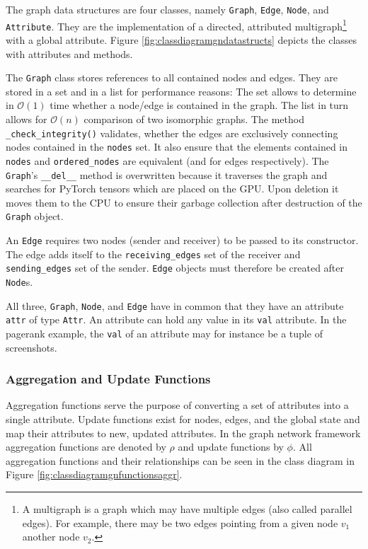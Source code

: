 The graph data structures are four classes, namely \texttt{Graph}, \texttt{Edge}, \texttt{Node}, and \texttt{Attribute}. They are the implementation of a directed, attributed multigraph\footnote{A multigraph is a graph which may have multiple edges (also called parallel edges). For example, there may be two edges pointing from a given node $v_1$ another node $v_2$.} with a global attribute. Figure \ref{fig:classdiagramgndatastructs} depicts the classes with attributes and methods.

The \texttt{Graph} class stores references to all contained nodes and edges. They are stored in a set and in a list for performance reasons: The set allows to determine in $\mathcal{O}(1)$ time whether a node/edge is contained in the graph. The list in turn allows for $\mathcal{O}(n)$ comparison of two isomorphic graphs. The method \texttt{\_check\_integrity()} validates, whether the edges are exclusively connecting nodes contained in the \texttt{nodes} set. It also ensure that the elements contained in \texttt{nodes} and \texttt{ordered\_nodes} are equivalent (and for edges respectively). The \texttt{Graph}'s \texttt{\_\_del\_\_} method is overwritten because it traverses the graph and searches for PyTorch tensors which are placed on the GPU. Upon deletion it moves them to the CPU to ensure their garbage collection after destruction of the \texttt{Graph} object.

An \texttt{Edge} requires two nodes (sender and receiver) to be passed to its constructor. The edge adds itself to the \texttt{receiving\_edges} set of the receiver and \texttt{sending\_edges} set of the sender. \texttt{Edge} objects must therefore be created after \texttt{Node}s.

All three, \texttt{Graph}, \texttt{Node}, and \texttt{Edge} have in common that they have an attribute \texttt{attr} of type \texttt{Attr}. An attribute can hold any value in its \texttt{val} attribute. In the pagerank example, the \texttt{val} of an attribute may for instance be a tuple of screenshots.

\subsubsection{Aggregation and Update Functions}

Aggregation functions serve the purpose of converting a set of attributes into a single attribute. Update functions exist for nodes, edges, and the global state and map their attributes to new, updated attributes. In the graph network framework aggregation functions are denoted by $\rho$ and update functions by $\phi$. All aggregation functions and their relationships can be seen in the class diagram in Figure \ref{fig:classdiagramgnfunctionsaggr}.

